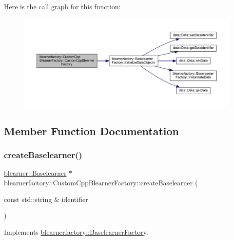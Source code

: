 Here is the call graph for this function\+:\nopagebreak
\begin{figure}[H]
\begin{center}
\leavevmode
\includegraphics[width=350pt]{classblearnerfactory_1_1_custom_cpp_blearner_factory_a390de0fb001434b3252e5f723c55d7b3_cgraph}
\end{center}
\end{figure}


\subsection{Member Function Documentation}
\mbox{\label{classblearnerfactory_1_1_custom_cpp_blearner_factory_ac98fae043e6822605261c7c6f7125e8c}} 
\subsubsection{\texorpdfstring{create\+Baselearner()}{createBaselearner()}}
{\footnotesize\ttfamily \mbox{\hyperlink{classblearner_1_1_baselearner}{blearner\+::\+Baselearner}} $\ast$ blearnerfactory\+::\+Custom\+Cpp\+Blearner\+Factory\+::create\+Baselearner (\begin{DoxyParamCaption}\item[{const std\+::string \&}]{identifier }\end{DoxyParamCaption})\hspace{0.3cm}{\ttfamily [virtual]}}



Implements \mbox{\hyperlink{classblearnerfactory_1_1_baselearner_factory_ac3584a20a84834099a15908690b837bb}{blearnerfactory\+::\+Baselearner\+Factory}}.

